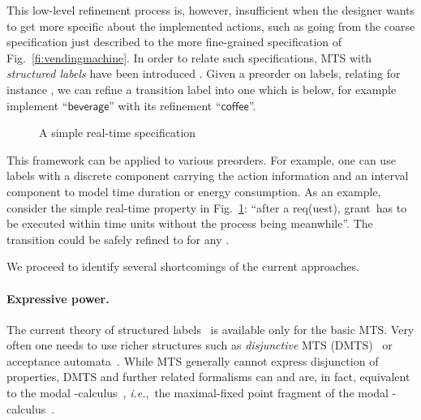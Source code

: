 \documentclass[twocolumn]{svjour3-dummy}
\newcommand{\edgelabel}[1]{\ensuremath{\mathsf{#1}}}
\newcommand{\beverage}{\edgelabel{beverage}}
\newcommand{\coffee}{\edgelabel{coffee}}
\newcommand*\req{\textsf{req}}
\newcommand*\grant{\textsf{grant}}
\newcommand*\ie{\textit{i.e.},}
\begin{document}
This low-level refinement process is, however, insufficient when the
designer wants to get more specific about the implemented actions, such
as going from the coarse specification just described to the more
fine-grained specification of Fig.~\ref{fi:vendingmachine}.  In order to
relate such specifications, MTS with \emph{structured labels} have been
introduced \cite{DBLP:journals/mscs/BauerJLLS12}. Given a preorder on
labels, relating for instance , we can refine a
transition label into one which is below, for example implement
``\beverage'' with its refinement ``\coffee''.

\begin{figure}
  \centering
  \caption{\label{fi:realtimeexint}
    A simple real-time specification}
\end{figure}

This framework can be applied to various preorders. For example, one can
use labels with a discrete component carrying the action information and
an interval component to model time duration or energy consumption.  As
an example, consider the simple real-time property in
Fig.~\ref{fi:realtimeexint}: ``after a \req(uest), \grant\ has to be
executed within  time units without the process being 
meanwhile''. The transition  could be safely refined to
 for any .

We proceed to identify several shortcomings of the current approaches.

\paragraph{Expressive power.} 

The current theory of structured
labels~\cite{DBLP:journals/mscs/BauerJLLS12,
  DBLP:journals/acta/FahrenbergL14} is available only for the basic
MTS. Very often one needs to use richer structures such as
\emph{disjunctive} MTS (DMTS)~\cite{DBLP:conf/lics/LarsenX90,
  DBLP:conf/atva/BenesCK11} or acceptance
automata~\cite{report/irisa/Raclet07,
  DBLP:journals/jacm/Hennessy85}. While MTS generally cannot express
disjunction of properties, DMTS and further related formalisms can and
are, in fact, equivalent to the modal
-calculus~\cite{DBLP:conf/concur/BenesDFKL13,
  DBLP:conf/ictac/FahrenbergLT14}, \ie~the maximal-fixed point
fragment of the modal -calculus~\cite{DBLP:journals/tcs/Kozen83}.
\end{document}
